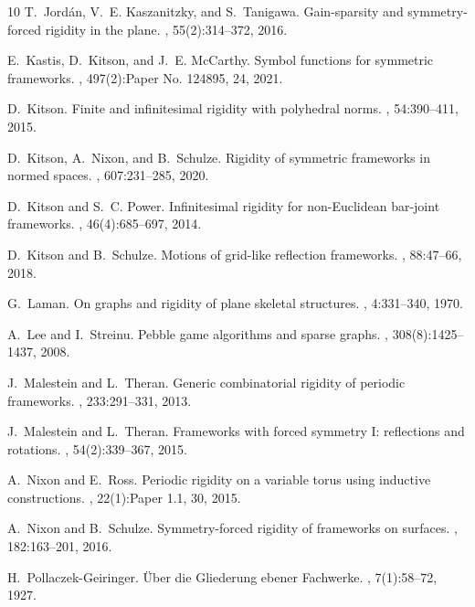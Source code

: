\documentclass[reqno,a4paper,10pt]{article}
\theoremstyle{definition}
\theoremstyle{remark}
\numberwithin{equation}{section}
\numberwithin{figure}{section}
\numberwithin{table}{section}
\begin{document}
\begin{thebibliography}{10}
T.~Jord\'an, V.~E. Kaszanitzky, and S.~Tanigawa.
\newblock Gain-sparsity and symmetry-forced rigidity in the plane.
, 55(2):314--372, 2016.

E.~Kastis, D.~Kitson, and J.~E. McCarthy.
\newblock Symbol functions for symmetric frameworks.
, 497(2):Paper No. 124895, 24, 2021.

D.~Kitson.
\newblock Finite and infinitesimal rigidity with polyhedral norms.
, 54:390--411, 2015.

D.~Kitson, A.~Nixon, and B.~Schulze.
\newblock Rigidity of symmetric frameworks in normed spaces.
, 607:231--285, 2020.

D.~Kitson and S.~C. Power.
\newblock Infinitesimal rigidity for non-{E}uclidean bar-joint frameworks.
, 46(4):685--697, 2014.

D.~Kitson and B.~Schulze.
\newblock Motions of grid-like reflection frameworks.
, 88:47--66, 2018.

G.~Laman.
\newblock On graphs and rigidity of plane skeletal structures.
, 4:331--340, 1970.

A.~Lee and I.~Streinu.
\newblock Pebble game algorithms and sparse graphs.
, 308(8):1425--1437, 2008.

J.~Malestein and L.~Theran.
\newblock Generic combinatorial rigidity of periodic frameworks.
, 233:291--331, 2013.

J.~Malestein and L.~Theran.
\newblock Frameworks with forced symmetry {I}: reflections and rotations.
, 54(2):339--367, 2015.

A.~Nixon and E.~Ross.
\newblock Periodic rigidity on a variable torus using inductive constructions.
, 22(1):Paper 1.1, 30, 2015.

A.~Nixon and B.~Schulze.
\newblock Symmetry-forced rigidity of frameworks on surfaces.
, 182:163--201, 2016.

H.~Pollaczek-Geiringer.
\newblock Über die {G}liederung ebener {F}achwerke.
, 7(1):58--72, 1927.


\end{thebibliography}
\end{document}
